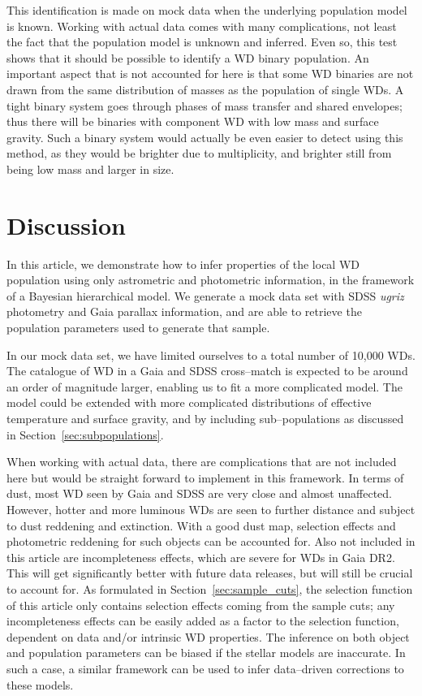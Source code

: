 \documentclass[fleqn,usenatbib]{mnras}
\begin{document}
This identification is made on mock data when the underlying population model is known. Working with actual data comes with many complications, not least the fact that the population model is unknown and inferred. Even so, this test shows that it should be possible to identify a WD binary population. An important aspect that is not accounted for here is that some WD binaries are not drawn from the same distribution of masses as the population of single WDs. A tight binary system goes through phases of mass transfer and shared envelopes; thus there will be binaries with component WD with low mass and surface gravity. Such a binary system would actually be even easier to detect using this method, as they would be brighter due to multiplicity, and brighter still from being low mass and larger in size.







\section{Discussion}\label{sec:discussion}

In this article, we demonstrate how to infer properties of the local WD population using only astrometric and photometric information, in the framework of a Bayesian hierarchical model. We generate a mock data set with SDSS \emph{ugriz} photometry and Gaia parallax information, and are able to retrieve the population parameters used to generate that sample.

In our mock data set, we have limited ourselves to a total number of 10,000 WDs. The catalogue of WD in a Gaia and SDSS cross--match is expected to be around an order of magnitude larger, enabling us to fit a more complicated model. The model could be extended with more complicated distributions of effective temperature and surface gravity, and by including sub--populations as discussed in Section~\ref{sec:subpopulations}.

When working with actual data, there are complications that are not included here but would be straight forward to implement in this framework. In terms of dust, most WD seen by Gaia and SDSS are very close and almost unaffected. However, hotter and more luminous WDs are seen to further distance and subject to dust reddening and extinction. With a good dust map, selection effects and photometric reddening for such objects can be accounted for. Also not included in this article are incompleteness effects, which are severe for WDs in Gaia DR2. This will get significantly better with future data releases, but will still be crucial to account for. As formulated in Section~\ref{sec:sample_cuts}, the selection function of this article only contains selection effects coming from the sample cuts; any incompleteness effects can be easily added as a factor to the selection function, dependent on data and/or intrinsic WD properties. The inference on both object and population parameters can be biased if the stellar models are inaccurate. In such a case, a similar framework can be used to infer data--driven corrections to these models.
\end{document}
